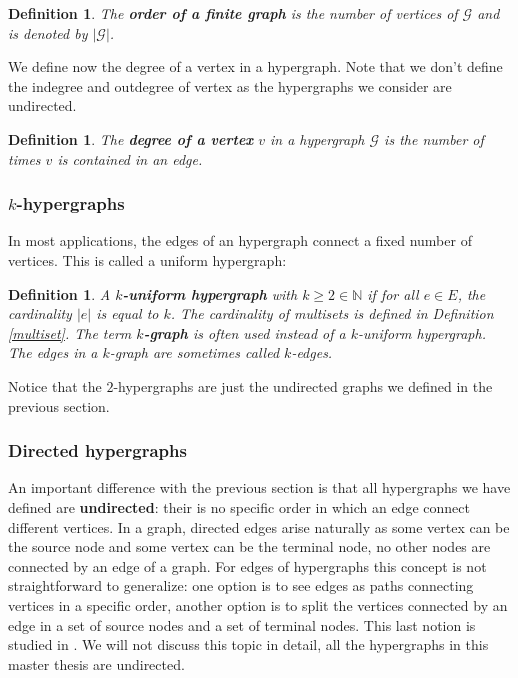 \documentclass[a4paper,11pt]{report}
\newtheorem{definition}[theorem]{Definition}
\newcommand{\N}{{\mathbb N}}
\newcommand{\hgraf}{\mathcal{G}}
\begin{document}
\begin{definition}
  The \textbf{order of a finite graph \hgraf} is the number of vertices of $\hgraf$ 
  and is denoted by $|\hgraf|$.
\end{definition}
We define now the degree of a vertex in a hypergraph. Note that we don't define 
the indegree and outdegree of vertex as the hypergraphs we consider are 
undirected.
\begin{definition}
The \textbf{degree of a vertex} $v$ in a hypergraph $\hgraf$ is the number of 
times $v$ is contained in an edge.
\end{definition}
\subsubsection{$k$-hypergraphs}
In most applications, the edges of an hypergraph connect a fixed number of 
vertices. This is called a uniform hypergraph:

\begin{definition}
  A \textbf{$k$-uniform hypergraph} with $k \geq 2 \in \N$ if for all $e \in E$, 
  the cardinality $|e|$ is equal to $k$. The cardinality of multisets is defined in Definition \ref{multiset}.
  The term \textbf{$k$-graph} is often used 
  instead of a $k$-uniform hypergraph. The edges in a $k$-graph are sometimes 
  called $k$-edges.
\end{definition}

Notice that the $2$-hypergraphs are just the undirected graphs we defined in the previous 
section.



\subsubsection{Directed hypergraphs}
An important difference with the previous section is that all hypergraphs we 
have defined are \textbf{undirected}: their is no specific order in which an 
edge connect different vertices. In a graph, directed edges arise naturally as 
some vertex can be the source node and some vertex can be the terminal node, no other nodes
are connected by an edge of a graph. For edges of hypergraphs this concept is not straightforward to generalize: one option is to see 
edges as paths connecting vertices in a specific order,
 another option is to split the vertices connected by an edge in a set of source 
 nodes and a set of terminal nodes. This last notion is 
studied in \cite{gallo}. We will not discuss this topic in detail, all the 
hypergraphs in this master thesis are undirected.
\end{document}
